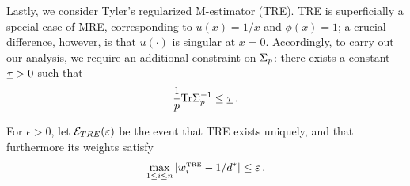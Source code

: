 \documentclass[times,sort&compress,3p]{elsarticle}
\begin{document}
Lastly, we consider Tyler's regularized M-estimator (TRE). TRE is superficially a special case of MRE, corresponding to $u(x)=1/x$ and $\phi(x)=1$; a crucial difference, however, is that $u(\cdot)$ is singular at $x=0$.
Accordingly, to carry out our analysis, we 
require
an additional constraint on $\Sigma_p$: there exists a constant $\underline{\tau}>0$ such that
\begin{equation}
    \frac{1}{p}\textrm{Tr}\Sigma_p^{-1} \le \underline{\tau} \,.
\end{equation}

For $\epsilon>0$, let $\mathcal{E}_{TRE}(\varepsilon)$ be the event that TRE exists uniquely, and that furthermore its weights satisfy 
        \begin{equation}
            \max_{1\le i \le n} |w^{\mbox{\tiny{TRE}}}_i-1/d^*| \le \varepsilon\,.
        \end{equation}
\end{document}

